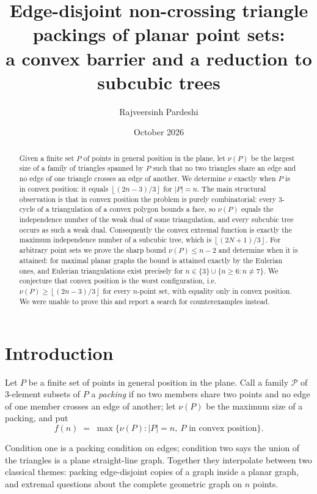\documentclass[11pt]{article}
\title{\bfseries Edge-disjoint non-crossing triangle packings of planar point sets:\\
a convex barrier and a reduction to subcubic trees}
\author{Rajveersinh Pardeshi}
\date{October 2026}
\theoremstyle{plain}
\theoremstyle{definition}
\theoremstyle{remark}
\newcommand{\Floor}[1]{\left\lfloor #1\right\rfloor}
\newcommand{\pack}{\mathcal{P}}
\begin{document}
\maketitle

\begin{abstract}
Given a finite set $P$ of points in general position in the plane, let $\nu(P)$ be the
largest size of a family of triangles spanned by $P$ such that no two triangles share an
edge and no edge of one triangle crosses an edge of another.  We determine $\nu$ exactly
when $P$ is in convex position: it equals $\Floor{(2n-3)/3}$ for $|P|=n$.  The main
structural observation is that in convex position the problem is purely combinatorial:
every $3$-cycle of a triangulation of a convex polygon bounds a face, so $\nu(P)$ equals
the independence number of the weak dual of some triangulation, and every subcubic tree
occurs as such a weak dual.  Consequently the convex extremal function is exactly the
maximum independence number of a subcubic tree, which is $\Floor{(2N+1)/3}$.  For
arbitrary point sets we prove the sharp bound $\nu(P)\le n-2$ and determine when it is
attained: for maximal planar graphs the bound is attained exactly by the Eulerian ones,
and Eulerian triangulations exist precisely for $n\in\{3\}\cup\{n\ge 6: n\ne 7\}$.  We
conjecture that convex position is the worst configuration, i.e.\
$\nu(P)\ge\Floor{(2n-3)/3}$ for every $n$-point set, with equality only in convex
position.  We were unable to prove this and report a search for counterexamples instead.
\end{abstract}

\section{Introduction}

Let $P$ be a finite set of points in general position in the plane.  Call a family
$\pack$ of $3$-element subsets of $P$ a \emph{packing} if no two members share two points
and no edge of one member crosses an edge of another; let $\nu(P)$ be the maximum size of
a packing, and put
\[
f(n)\;=\;\max\{\nu(P): |P|=n,\ P\text{ in convex position}\}.
\]

Condition one is a packing condition on edges; condition two says the union of the
triangles is a plane straight-line graph.  Together they interpolate between two classical
themes: packing edge-disjoint copies of a graph inside a planar graph, and extremal
questions about the complete geometric graph on $n$ points.
\end{document}
